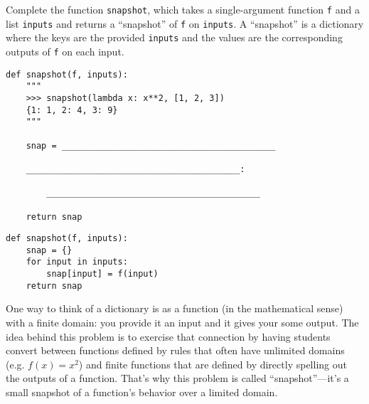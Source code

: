 \begin{blocksection}
\question Complete the function \lstinline{snapshot}, which takes a single-argument function \lstinline{f} and a list \lstinline{inputs} and returns a ``snapshot'' of \lstinline{f} on \lstinline{inputs}. A ``snapshot'' is a dictionary where the keys are the provided \lstinline{inputs} and the values are the corresponding outputs of \lstinline{f} on each input.

\begin{lstlisting}
def snapshot(f, inputs):
    """
    >>> snapshot(lambda x: x**2, [1, 2, 3])
    {1: 1, 2: 4, 3: 9}
    """

    snap = __________________________________________

    __________________________________________:

        __________________________________________
        
    return snap
\end{lstlisting}

\begin{solution}
\begin{lstlisting}
def snapshot(f, inputs):
    snap = {}
    for input in inputs:
        snap[input] = f(input)
    return snap
\end{lstlisting}
\end{solution}
\end{blocksection}

\begin{questionmeta}
One way to think of a dictionary is as a function (in the mathematical sense) with a finite domain: you provide it an input and it gives your some output. The idea behind this problem is to exercise that connection by having students convert between functions defined by rules that often have unlimited domains (e.g. $f(x) = x^2$) and finite functions that are defined by directly spelling out the outputs of a function. That's why this problem is called ``snapshot''---it's a small snapshot of a function's behavior over a limited domain. 
\end{questionmeta}